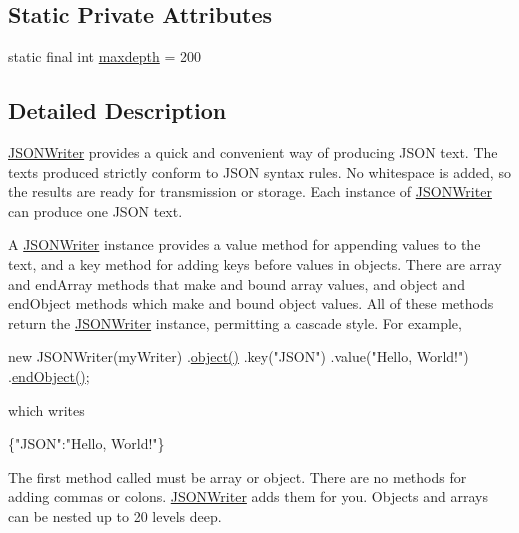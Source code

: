 \subsection*{Static Private Attributes}
\begin{DoxyCompactItemize}
\item 
static final int \hyperlink{classorg_1_1json_1_1_j_s_o_n_writer_a91e980e27ba1a1130621393aa245491a}{maxdepth} = 200
\end{DoxyCompactItemize}


\subsection{Detailed Description}
\hyperlink{classorg_1_1json_1_1_j_s_o_n_writer}{J\-S\-O\-N\-Writer} provides a quick and convenient way of producing J\-S\-O\-N text. The texts produced strictly conform to J\-S\-O\-N syntax rules. No whitespace is added, so the results are ready for transmission or storage. Each instance of \hyperlink{classorg_1_1json_1_1_j_s_o_n_writer}{J\-S\-O\-N\-Writer} can produce one J\-S\-O\-N text. 

A \hyperlink{classorg_1_1json_1_1_j_s_o_n_writer}{J\-S\-O\-N\-Writer} instance provides a {\ttfamily value} method for appending values to the text, and a {\ttfamily key} method for adding keys before values in objects. There are {\ttfamily array} and {\ttfamily end\-Array} methods that make and bound array values, and {\ttfamily object} and {\ttfamily end\-Object} methods which make and bound object values. All of these methods return the \hyperlink{classorg_1_1json_1_1_j_s_o_n_writer}{J\-S\-O\-N\-Writer} instance, permitting a cascade style. For example, 
\begin{DoxyPre}
new JSONWriter(myWriter)
    .\hyperlink{classorg_1_1json_1_1_j_s_o_n_writer_a50ed212b9c8c9f6a57c3ddfc6bf3126a}{object()}
        .key("JSON")
        .value("Hello, World!")
    .\hyperlink{classorg_1_1json_1_1_j_s_o_n_writer_a25cc931ef86998c61f08b1d5eff22146}{endObject()};\end{DoxyPre}
 which writes 
\begin{DoxyPre}
\{"JSON":"Hello, World!"\}\end{DoxyPre}
 

The first method called must be {\ttfamily array} or {\ttfamily object}. There are no methods for adding commas or colons. \hyperlink{classorg_1_1json_1_1_j_s_o_n_writer}{J\-S\-O\-N\-Writer} adds them for you. Objects and arrays can be nested up to 20 levels deep. 

